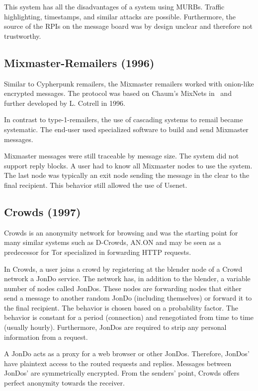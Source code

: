 This system has all the disadvantages of a system using MURBs. Traffic highlighting, timestamps, and similar attacks are possible. Furthermore, the source of the RPIs on the message board was by design unclear and therefore not trustworthy.

\subsection{Mixmaster-Remailers (1996)\label{sec:remMixmaster}}
Similar to Cypherpunk remailers, the Mixmaster remailers worked with onion-like encrypted messages. The protocol was based on Chaum's MixNets in~\cite{CHAUM1} and further developed by L. Cotrell in 1996. 

In contrast to type-1-remailers, the use of cascading systems to remail became systematic. The end-user used specialized software to build and send Mixmaster messages.

Mixmaster messages were still traceable by message size. The system did not support reply blocks. A user had to know all Mixmaster nodes to use the system. The last node was typically an exit node sending the message in the clear to the final recipient. This behavior still allowed the use of Usenet.

\subsection{Crowds (1997)}
Crowds is an anonymity network for browsing and was the starting point for many similar systems such as D-Crowds, AN.ON and may be seen as a predecessor for Tor specialized in forwarding HTTP requests. 

In Crowds, a user joins a crowd by registering at the blender node of a Crowd network a JonDo service. The network has, in addition to the blender, a variable number of nodes called JonDos. These nodes are forwarding nodes that either send a message to another random JonDo (including themselves) or forward it to the final recipient. The behavior is chosen based on a probability factor. The behavior is constant for a period (connection) and renegotiated from time to time (usually hourly). Furthermore, JonDos are required to strip any personal information from a request. 

A JonDo acts as a proxy for a web browser or other JonDos. Therefore, JonDos' have plaintext access to the routed requests and replies. Messages between JonDos' are symmetrically encrypted. From the senders' point, Crowds offers perfect anonymity towards the receiver. 

